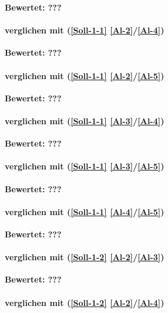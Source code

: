 \textbf{Bewertet: ???}

\paragraph*{  verglichen mit  (\ref{Soll-1-1} \ref{Al-2}/\ref{Al-4})}

\textbf{Bewertet: ???}

\paragraph*{  verglichen mit  (\ref{Soll-1-1} \ref{Al-2}/\ref{Al-5})}

\textbf{Bewertet: ???}

\paragraph*{  verglichen mit  (\ref{Soll-1-1} \ref{Al-3}/\ref{Al-4})}

\textbf{Bewertet: ???}

\paragraph*{  verglichen mit  (\ref{Soll-1-1} \ref{Al-3}/\ref{Al-5})}

\textbf{Bewertet: ???}


\paragraph*{  verglichen mit  (\ref{Soll-1-1} \ref{Al-4}/\ref{Al-5})}

\textbf{Bewertet: ???}

\paragraph*{  verglichen mit  (\ref{Soll-1-2} \ref{Al-2}/\ref{Al-3})}

\textbf{Bewertet: ???}

\paragraph*{  verglichen mit  (\ref{Soll-1-2} \ref{Al-2}/\ref{Al-4})}

